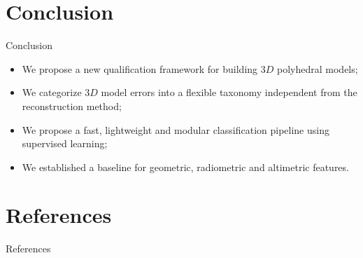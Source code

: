 \documentclass{beamer}
\begin{document}
    \section{Conclusion}
        \begin{frame}{Conclusion}
            \begin{itemize}[label=$\blacktriangleright$, font=\color{IGNGreen}]
                \item<1-> We propose a new qualification framework for building $3D$ polyhedral models;
                \item<2-> We categorize $3D$ model errors into a flexible taxonomy independent from the reconstruction method;
                \item<3-> We propose a fast, lightweight and modular classification pipeline using supervised learning;
                \item<4-> We established a baseline for geometric, radiometric and altimetric features.
            \end{itemize}
        \end{frame}
    \section*{References}
        \begin{frame}[allowframebreaks]{References}
            \printbibliography
        \end{frame}
    \appendix
\end{document}
